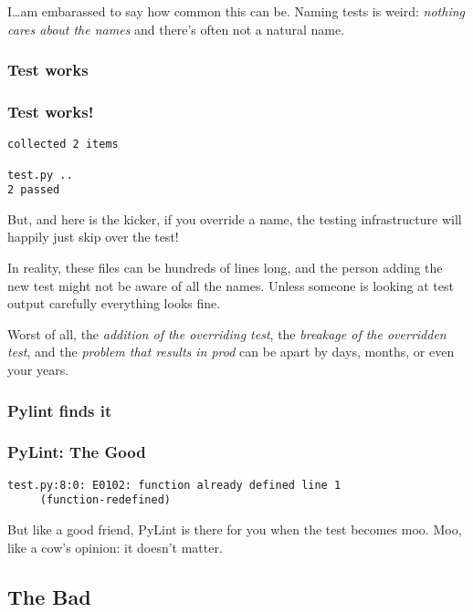 \documentclass[ignorenonframetext]{beamer}
\begin{document}
I\ldots am embarassed to say how common this can be. Naming tests is
weird: \emph{nothing cares about the names} and there's often not a
natural name.

\hypertarget{test-works}{%
\subsubsection{Test works}\label{test-works}}

\begin{frame}[fragile]
\frametitle{Test works!}

\begin{lstlisting}
collected 2 items                                                                         

test.py .. 
2 passed 
\end{lstlisting}

\end{frame}

But, and here is the kicker, if you override a name, the testing
infrastructure will happily just skip over the test!

In reality, these files can be hundreds of lines long, and the person
adding the new test might not be aware of all the names. Unless someone
is looking at test output carefully everything looks fine.

Worst of all, the \emph{addition of the overriding test}, the
\emph{breakage of the overridden test}, and the \emph{problem that
results in prod} can be apart by days, months, or even your years.

\hypertarget{pylint-finds-it}{%
\subsubsection{Pylint finds it}\label{pylint-finds-it}}

\begin{frame}[fragile]
\frametitle{PyLint: The Good}

\begin{lstlisting}
test.py:8:0: E0102: function already defined line 1
     (function-redefined)
\end{lstlisting}

\end{frame}

But like a good friend, PyLint is there for you when the test becomes
moo. Moo, like a cow's opinion: it doesn't matter.

\hypertarget{the-bad}{%
\subsection{The Bad}\label{the-bad}}
\end{document}
